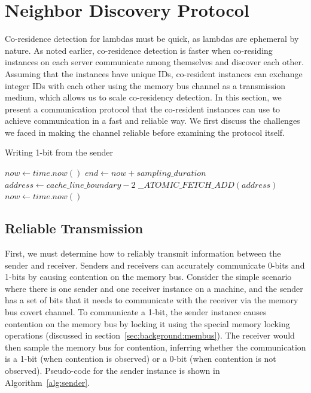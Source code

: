 \section{Neighbor Discovery Protocol}
\label{sec:technique}
 
Co-residence detection for lambdas must be quick, as lambdas are ephemeral by
nature. As noted earlier, co-residence detection is faster when co-residing
instances on each server communicate among themselves and discover each other.
Assuming that the instances have unique IDs, co-resident instances can exchange
integer IDs with each other using the memory bus channel as a transmission
medium, which allows us to scale co-residency detection.  In this section, we
present a communication protocol that the co-resident instances can use to
achieve communication in a fast and reliable way. We first discuss the
challenges we faced in making the channel reliable before examining the protocol
itself.

\begin{algorithm}[!t]
\caption{Writing 1-bit from the sender}
\label{alg:sender}
\begin{algorithmic}
\STATE $now \leftarrow  time.now()$
\STATE $end \leftarrow now + sampling\_duration$
\STATE $address \leftarrow cache\_line\_boundary-2$
    \STATE $\_\_ATOMIC\_FETCH\_ADD(address)$
    \STATE $now \leftarrow  time.now()$
\ENDWHILE
\end{algorithmic}
\end{algorithm}

\subsection{Reliable Transmission}
First, we must determine how to reliably transmit information between the sender
and receiver. Senders and receivers can accurately communicate 0-bits and 1-bits
by causing contention on the memory bus. Consider the simple scenario where
there is one sender and one receiver instance on a machine, and the sender has a
set of bits that it needs to communicate with the receiver via the memory bus
covert channel.  To communicate a 1-bit, the sender instance causes contention
on the memory bus by locking it using the special memory locking operations
(discussed in section~\ref{sec:background:membus}). The receiver would then
sample the memory bus for contention, inferring whether the communication is a
1-bit (when contention is observed) or a 0-bit (when contention is not
observed). Pseudo-code for the sender instance is shown in
Algorithm~\ref{alg:sender}.

